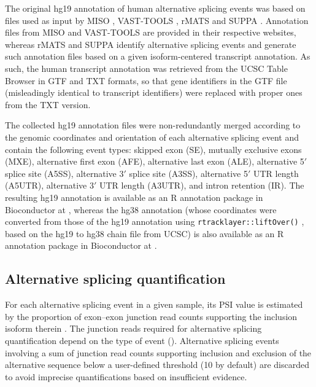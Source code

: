 The original hg19 annotation of human alternative splicing events was based on files used as input by MISO \cite{katz:2010tj}, VAST-TOOLS \cite{irimia:2014wt}, rMATS \cite{shen:2014tk} and SUPPA \cite{alamancos:2015vc}. Annotation files from MISO and VAST-TOOLS are provided in their respective websites, whereas rMATS and SUPPA identify alternative splicing events and generate such annotation files based on a given isoform-centered transcript annotation. As such, the human transcript annotation was retrieved from the UCSC Table Browser \cite{karolchik:2004wa} in GTF and TXT formats, so that gene identifiers in the GTF file (misleadingly identical to transcript identifiers) were replaced with proper ones from the TXT version.

The collected hg19 annotation files were non-redundantly merged according to the genomic coordinates and orientation of each alternative splicing event and contain the following event types: skipped exon (SE), mutually exclusive exons (MXE), alternative first exon (AFE), alternative last exon (ALE), alternative 5$'$ splice site (A5SS), alternative 3$'$ splice site (A3SS), alternative 5$'$ UTR length (A5UTR), alternative 3$'$ UTR length (A3UTR), and intron retention (IR). The resulting hg19 annotation is available as an R annotation package in Bioconductor at , whereas the hg38 annotation (whose coordinates were converted from those of the hg19 annotation using \texttt{rtracklayer::liftOver()} \cite{lawrence:2009us}, based on the hg19 to hg38 chain file from UCSC) is also available as an R annotation package in Bioconductor at .

\subsection{Alternative splicing quantification}
\label{sec:psi-quantification}

For each alternative splicing event in a given sample, its PSI value is estimated by the proportion of exon–exon junction read counts supporting the inclusion isoform therein \cite{wang:2008wa}. The junction reads required for alternative splicing quantification depend on the type of event (). Alternative splicing events involving a sum of junction read counts supporting inclusion and exclusion of the alternative sequence below a user-defined threshold (10 by default) are discarded to avoid imprecise quantifications based on insufficient evidence.


